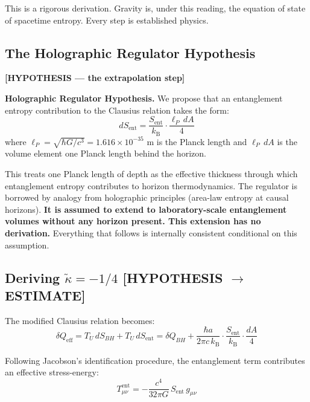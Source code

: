 \documentclass[12pt,letterpaper]{article}
\theoremstyle{plain}
\theoremstyle{definition}
\theoremstyle{remark}
\newcommand{\kB}{k_{\mathrm{B}}}
\newcommand{\Sent}{S_{\mathrm{ent}}}
\newcommand{\lP}{\ell_P}
\begin{document}
This is a rigorous derivation. Gravity is, under this reading, the
equation of state of spacetime entropy. Every step is established physics.

\subsection{The Holographic Regulator Hypothesis}
\label{subsec:holo_reg}
\textcolor{orange!80!black}{\textbf{[HYPOTHESIS --- the extrapolation step]}}

\begin{corestatement}
\textbf{Holographic Regulator Hypothesis.} We propose that an
entanglement entropy contribution to the Clausius relation takes the form:
\begin{equation}
  dS_{\mathrm{ent}} = \frac{\Sent}{\kB}\cdot\frac{\lP\,dA}{4}
  \tag{A2.3}
\end{equation}
where $\lP = \sqrt{\hbar G/c^3} = 1.616\times10^{-35}$ m is the
Planck length and $\lP\,dA$ is the volume element one Planck length
behind the horizon.

This treats one Planck length of depth as the effective thickness
through which entanglement entropy contributes to horizon thermodynamics.
The regulator is borrowed by analogy from holographic principles (area-law
entropy at causal horizons). \textbf{It is assumed to extend to
laboratory-scale entanglement volumes without any horizon present.
This extension has no derivation.} Everything that follows is internally
consistent conditional on this assumption.
\end{corestatement}

\subsection{Deriving $\tilde{\kappa} = -1/4$
  \textcolor{orange!80!black}{[HYPOTHESIS $\to$ ESTIMATE]}}

The modified Clausius relation becomes:
\begin{equation}
  \delta Q_{\mathrm{eff}} = T_U\,dS_{BH} + T_U\,dS_{\mathrm{ent}}
  = \delta Q_{BH} + \frac{\hbar a}{2\pi c\,\kB}\cdot\frac{\Sent}{\kB}
  \cdot\frac{dA}{4}
  \tag{A2.4}
\end{equation}

Following Jacobson's identification procedure, the entanglement term
contributes an effective stress-energy:
\begin{equation}
  T^{\mathrm{ent}}_{\mu\nu} = -\frac{c^4}{32\pi G}\,\Sent\,g_{\mu\nu}
  \tag{A2.5}
\end{equation}
\end{document}

